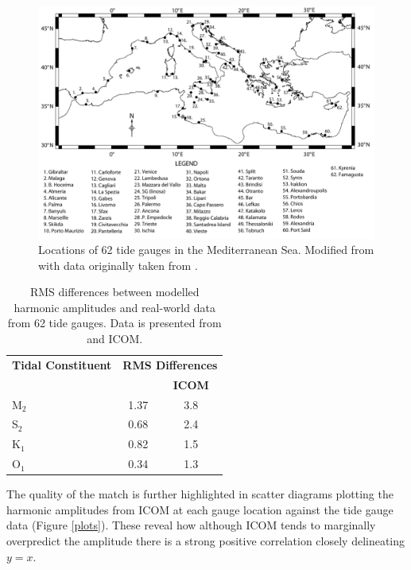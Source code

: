 \begin{figure}[htbp]
\centering
\includegraphics[width=\textwidth]{./examples_images/tides_in_the_Mediterranean_Sea/gauges.pdf}
\caption{Locations of 62 tide gauges in the Mediterranean Sea. Modified from \citet{Wells2008} with data originally taken from 
\citet{Tsimplis1995}. }
\label{gauge}
\end{figure}

\begin{table}[htbp]
\centering
\begin{tabular}{l c c}
\hline
\bf{Tidal Constituent} & \multicolumn{2}{c}{\bf{RMS Differences}} \\
\cline{2-3}
& \bf{\citet{Tsimplis1995}} & \bf{ICOM} \\
\hline
M$_{\text{2}}$ &1.37 & 3.8\\
S$_{\text{2}}$ &0.68 & 2.4\\
K$_{\text{1}}$ &0.82 & 1.5\\
O$_{\text{1}}$ &0.34 & 1.3\\
\hline
\end{tabular}
\caption{RMS differences between modelled harmonic amplitudes and real-world data from 62 tide gauges.
Data is presented from \citet{Tsimplis1995} and ICOM. }
\label{rms}
\end{table}

The quality of the match is further highlighted in scatter diagrams plotting 
the harmonic amplitudes from ICOM at each gauge location against the tide gauge data (Figure \ref{plots}).
These reveal how although ICOM tends to marginally overpredict the amplitude there is a strong
positive correlation closely delineating $y=x$. 

